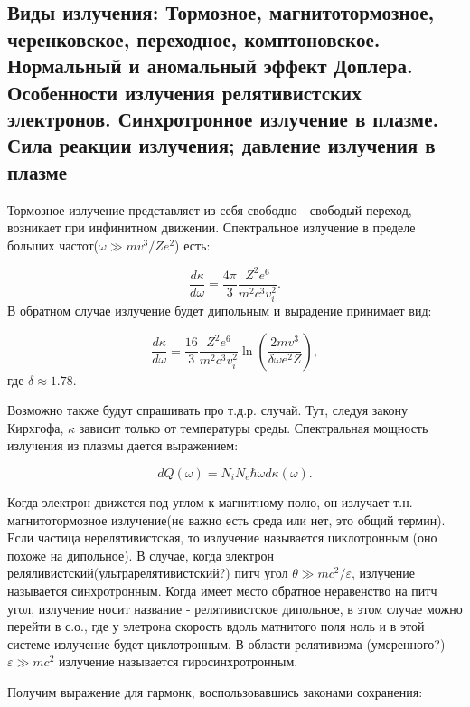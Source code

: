 \documentclass[10pt, a4paper]{article}
\begin{document}
\subsection{Виды излучения: Тормозное, магнитотормозное, черенковское, переходное, комптоновское. Нормальный и аномальный эффект Доплера. Особенности излучения релятивистских электронов. Синхротронное излучение в плазме. Сила реакции излучения; давление излучения в плазме}

Тормозное излучение представляет из себя свободно - свободый переход, возникает при инфинитном движении. 
Спектральное излучение в пределе больших частот($\omega \gg mv^3/Ze^2$) есть:

\begin{equation}
    \frac{d\kappa}{d\omega}=\frac{4\pi}{3}\frac{Z^2 e^6}{m^2 c^3 v_i^2}.
\end{equation}
В обратном случае излучение будет дипольным и вырадение принимает вид:

\begin{equation}
    \frac{d\kappa}{d\omega}=\frac{16}{3}\frac{Z^2 e^6}{m^2 c^3 v_i^2} \ln\left(\frac{2mv^3}{\delta \omega e^2 Z} \right),
\end{equation}
где $\delta \approx 1.78$.

Возможно также будут спрашивать про т.д.р. случай. Тут, следуя закону Кирхгофа, $\kappa$ зависит только от температуры среды. Спектральная мощность излучения из плазмы дается выражением:

\begin{equation}
    dQ(\omega)=N_i N_e \hbar \omega d\kappa(\omega).
\end{equation}

Когда электрон движется под углом к магнитному полю, он излучает т.н. магнитотормозное излучение(не важно есть среда или
нет, это общий термин). Если частица нерелятивистская, то излучение называется циклотронным (оно похоже на дипольное). В
случае, когда электрон реляливистский(ультрарелятивистский?) питч угол $\theta \gg mc^2/\varepsilon$, излучение
называется синхротронным. Когда имеет место обратное неравенство на питч угол, излучение носит название - релятивистское
дипольное, в этом случае можно перейти в с.о., где у элетрона скорость вдоль матнитого поля ноль и в этой системе
излучение будет циклотронным. В области релятивизма (умеренного?) $\varepsilon\gg mc^2$ излучение называется
гиросинхротронным.

Получим выражение для гармонк, воспользовавшись законами сохранения:
\end{document}
